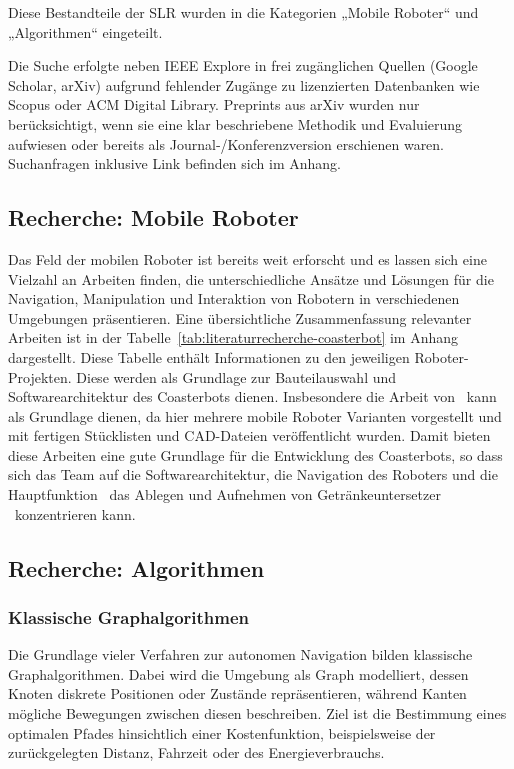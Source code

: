 \documentclass[
  a4paper,
  12pt,
  DIV=12,        %
  parskip=half,  %
  headings=small %
]{scrartcl}
\theoremstyle{definition}
\theoremstyle{definition}
\begin{document}
Diese Bestandteile der SLR wurden in die Kategorien „Mobile Roboter“ und
„Algorithmen“ eingeteilt.

Die Suche erfolgte neben IEEE Explore in frei zugänglichen Quellen (Google
Scholar, arXiv) aufgrund fehlender Zugänge zu lizenzierten Datenbanken wie
Scopus oder ACM Digital Library. Preprints aus arXiv wurden nur berücksichtigt,
wenn sie eine klar beschriebene Methodik und Evaluierung aufwiesen oder bereits
als Journal‑/Konferenzversion erschienen waren. Suchanfragen inklusive Link
befinden sich im Anhang.

\subsection{Recherche: Mobile Roboter}
Das Feld der mobilen Roboter ist bereits weit erforscht und es lassen sich eine Vielzahl an Arbeiten finden, die unterschiedliche Ansätze und Lösungen für die Navigation, Manipulation und Interaktion von Robotern in verschiedenen Umgebungen präsentieren. Eine übersichtliche Zusammenfassung relevanter Arbeiten ist in der Tabelle~\ref{tab:literaturrecherche-coasterbot} im Anhang dargestellt. Diese Tabelle enthält Informationen zu den jeweiligen Roboter-Projekten. Diese werden als Grundlage zur Bauteilauswahl und Softwarearchitektur des Coasterbots dienen. Insbesondere die Arbeit von~\cite{Balbuena2026Mar} kann als Grundlage dienen, da hier mehrere mobile Roboter Varianten vorgestellt und mit fertigen Stücklisten und CAD-Dateien veröffentlicht wurden. Damit bieten diese Arbeiten eine gute Grundlage für die Entwicklung des Coasterbots, so dass sich das Team auf die Softwarearchitektur, die Navigation des Roboters und die Hauptfunktion \textemdash~das Ablegen und Aufnehmen von Getränkeuntersetzer \textemdash~konzentrieren kann.


\subsection{Recherche: Algorithmen}


\subsubsection{Klassische Graphalgorithmen}

Die Grundlage vieler Verfahren zur autonomen Navigation bilden klassische
Graphalgorithmen. Dabei wird die Umgebung als Graph modelliert, dessen Knoten
diskrete Positionen oder Zustände repräsentieren, während Kanten mögliche
Bewegungen zwischen diesen beschreiben. Ziel ist die Bestimmung eines optimalen
Pfades hinsichtlich einer Kostenfunktion, beispielsweise der zurückgelegten
Distanz, Fahrzeit oder des Energieverbrauchs.
\end{document}

